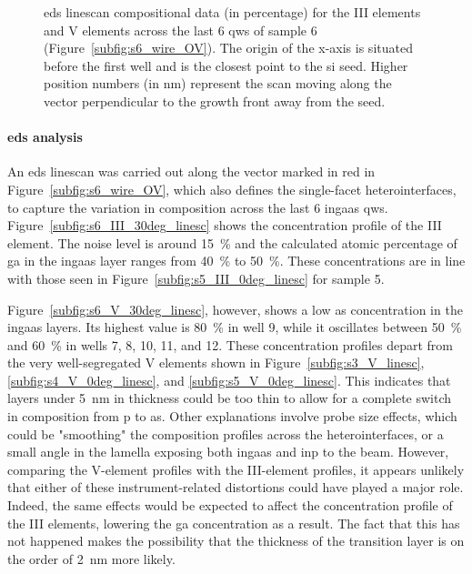 \begin{figure}
{\begin{tikzpicture}
    \end{tikzpicture}
    }
    \caption{\acs{eds} linescan compositional data (in percentage) for the  III elements and  V elements 
    across the last \num{6} \acl{qw}s of sample 6 (Figure~\ref{subfig:s6_wire_OV}). The origin of the x-axis is situated before the first well and is the closest point to the \acs{si} seed. Higher position numbers (in nm) represent the scan moving along the  vector perpendicular to the growth front away from the seed.}
    \label{fig:s6_30deg_linescans}
\end{figure}

\paragraph{\acs{eds} analysis} An \acs{eds} linescan was carried out along the  vector marked in red in Figure~\ref{subfig:s6_wire_OV}, which also defines the  single-facet heterointerfaces, to capture the variation in composition across the last \num{6} \acs{ingaas} \acl{qw}s. Figure~\ref{subfig:s6_III_30deg_linesc} shows the concentration profile of the III element. The noise level is around \qty{15}{\%} and the calculated atomic percentage of \acl{ga} in the \acs{ingaas} layer ranges from \qty{40}{\%} to \qty{50}{\%}. These concentrations are in line with those seen in Figure~\ref{subfig:s5_III_0deg_linesc} for sample 5.

Figure~\ref{subfig:s6_V_30deg_linesc}, however, shows a low \acl{as} concentration in the \acs{ingaas} layers. Its highest value is \qty{80}{\%} in well \num{9}, while it oscillates between \qty{50}{\%} and \qty{60}{\%} in wells \num{7}, \num{8}, \num{10}, \num{11}, and \num{12}. These concentration profiles depart from the very well-segregated V elements shown in Figure~\ref{subfig:s3_V_linesc}, \ref{subfig:s4_V_0deg_linesc}, and \ref{subfig:s5_V_0deg_linesc}. This indicates that layers under \qty{5}{\nano\metre} in thickness could be too thin to allow for a complete switch in composition from \acl{p} to \acs{as}. Other explanations involve probe size effects, which could be "smoothing" the composition profiles across the heterointerfaces, or a small angle in the lamella exposing both \acs{ingaas} and \acs{inp} to the beam. However, comparing the V-element profiles with the III-element profiles, it appears unlikely that either of these instrument-related distortions could have played a major role. Indeed, the same effects would be expected to affect the concentration profile of the III elements, lowering the \acl{ga} concentration as a result. The fact that this has not happened makes the possibility that the thickness of the transition layer is on the order of \qty{2}{\nano\metre} more likely.

